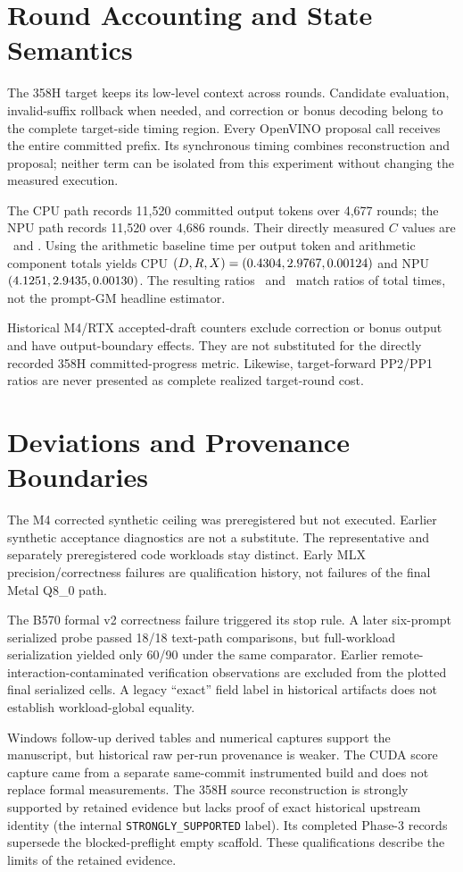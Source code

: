 \documentclass{article}
\begin{document}
\section{Round Accounting and State Semantics}
The 358H target keeps its low-level context across rounds. Candidate evaluation, invalid-suffix rollback when needed, and correction or bonus decoding belong to the complete target-side timing region. Every OpenVINO proposal call receives the entire committed prefix. Its synchronous timing combines reconstruction and proposal; neither term can be isolated from this experiment without changing the measured execution.

The CPU path records 11,520 committed output tokens over 4,677 rounds; the NPU path records 11,520 over 4,686 rounds. Their directly measured $C$ values are \HcpuC\ and \HnpuC. Using the arithmetic baseline time per output token and arithmetic component totals yields CPU $(D,R,X)=(0.4304,2.9767,0.00124)$ and NPU $(4.1251,2.9435,0.00130)$. The resulting ratios \HcpuAggregate\ and \HnpuAggregate\ match ratios of total times, not the prompt-GM headline estimator.

Historical M4/RTX accepted-draft counters exclude correction or bonus output and have output-boundary effects. They are not substituted for the directly recorded 358H committed-progress metric. Likewise, target-forward PP2/PP1 ratios are never presented as complete realized target-round cost.

\section{Deviations and Provenance Boundaries}
The M4 corrected synthetic ceiling was preregistered but not executed. Earlier synthetic acceptance diagnostics are not a substitute. The representative and separately preregistered code workloads stay distinct. Early MLX precision/correctness failures are qualification history, not failures of the final Metal Q8\_0 path.

The B570 formal v2 correctness failure triggered its stop rule. A later six-prompt serialized probe passed 18/18 text-path comparisons, but full-workload serialization yielded only 60/90 under the same comparator. Earlier remote-interaction-contaminated verification observations are excluded from the plotted final serialized cells. A legacy ``exact'' field label in historical artifacts does not establish workload-global equality.

Windows follow-up derived tables and numerical captures support the manuscript, but historical raw per-run provenance is weaker. The CUDA score capture came from a separate same-commit instrumented build and does not replace formal measurements. The 358H source reconstruction is strongly supported by retained evidence but lacks proof of exact historical upstream identity (the internal \texttt{STRONGLY\_SUPPORTED} label). Its completed Phase-3 records supersede the blocked-preflight empty scaffold. These qualifications describe the limits of the retained evidence.
\end{document}
